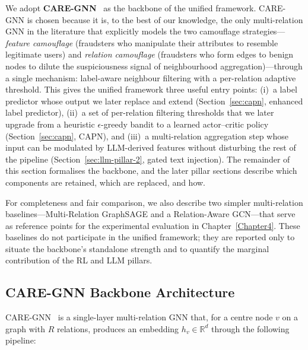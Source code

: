 We adopt \textbf{CARE-GNN}~\cite{dou2020enhancing} as the backbone of the unified framework. CARE-GNN is chosen because it is, to the best of our knowledge, the only multi-relation GNN in the literature that explicitly models the two camouflage strategies---\textit{feature camouflage} (fraudsters who manipulate their attributes to resemble legitimate users) and \textit{relation camouflage} (fraudsters who form edges to benign nodes to dilute the suspiciousness signal of neighbourhood aggregation)---through a single mechanism: label-aware neighbour filtering with a per-relation adaptive threshold. This gives the unified framework three useful entry points: (i)~a label predictor whose output we later replace and extend (Section~\ref{sec:capn}, enhanced label predictor), (ii)~a set of per-relation filtering thresholds that we later upgrade from a heuristic $\epsilon$-greedy bandit to a learned actor--critic policy (Section~\ref{sec:capn}, CAPN), and (iii)~a multi-relation aggregation step whose input can be modulated by LLM-derived features without disturbing the rest of the pipeline (Section~\ref{sec:llm-pillar-2}, gated text injection). The remainder of this section formalises the backbone, and the later pillar sections describe which components are retained, which are replaced, and how.

For completeness and fair comparison, we also describe two simpler multi-relation baselines---Multi-Relation GraphSAGE and a Relation-Aware GCN---that serve as reference points for the experimental evaluation in Chapter~\ref{Chapter4}. These baselines do not participate in the unified framework; they are reported only to situate the backbone's standalone strength and to quantify the marginal contribution of the RL and LLM pillars.

\subsection{CARE-GNN Backbone Architecture}
\label{sec:care-gnn}

CARE-GNN~\cite{dou2020enhancing} is a single-layer multi-relation GNN that, for a centre node $v$ on a graph with $R$ relations, produces an embedding $h_v \in \mathbb{R}^{d}$ through the following pipeline:

